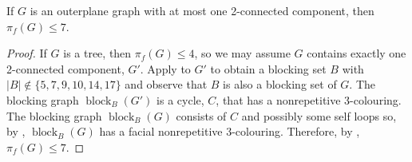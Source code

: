 \documentclass{patmorin}
\DeclareMathOperator{\block}{block}
\begin{document}
\begin{cor}
  If $G$ is an outerplane graph with at most one 2-connected component, 
  then $\pi_f(G)\le 7$.
\end{cor}

\begin{proof}
  If $G$ is a tree, then $\pi_f(G)\le 4$, so we may assume $G$ contains
  exactly one 2-connected component, $G'$.  Apply  to
  $G'$ to obtain a blocking set $B$ with $|B|\not\in\{5,7,9,10,14,17\}$
  and observe that $B$ is also a blocking set of $G$.  The blocking graph
  $\block_B(G')$ is a cycle, $C$, that has a nonrepetitive 3-colouring.
  The blocking graph $\block_B(G)$ consists of $C$ and possibly some
  self loops so, by , $\block_B(G)$ has a facial
  nonrepetitive 3-colouring.  Therefore, by ,
  $\pi_f(G)\le 7$.
\end{proof}
\end{document}
